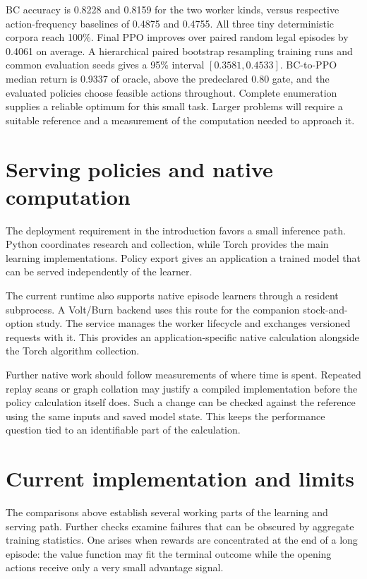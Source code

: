 \documentclass{strategynet-journal}
\begin{document}
BC accuracy is 0.8228 and 0.8159 for the two worker kinds, versus respective
action-frequency baselines of 0.4875 and 0.4755.  All three tiny deterministic
corpora reach 100\%.  Final PPO improves over paired random legal episodes by
0.4061 on average.  A hierarchical paired bootstrap resampling training runs
and common evaluation seeds gives a 95\% interval $[0.3581,0.4533]$.
BC-to-PPO median return is 0.9337 of oracle, above the predeclared 0.80 gate,
and the evaluated policies choose feasible actions throughout. Complete
enumeration supplies a reliable optimum for this small task. Larger problems
will require a suitable reference and a measurement of the computation needed
to approach it.

\begin{SNcolumns}

\section{Serving policies and native computation}

The deployment requirement in the introduction favors a small inference path.
Python coordinates research and collection, while Torch provides the main
learning implementations. Policy export gives an application a trained model
that can be served independently of the learner.

The current runtime also supports native episode learners through a resident
subprocess. A Volt/Burn backend uses this route for the companion
stock-and-option study. The service manages the worker lifecycle and exchanges
versioned requests with it. This provides an application-specific native
calculation alongside the Torch algorithm collection.

Further native work should follow measurements of where time is spent.
Repeated replay scans or graph collation may justify a compiled implementation
before the policy calculation itself does. Such a change can be checked against
the reference using the same inputs and saved model state. This keeps the
performance question tied to an identifiable part of the calculation.

\section{Current implementation and limits}

The comparisons above establish several working parts of the learning and
serving path. Further checks examine failures that can be obscured by aggregate
training statistics. One arises when rewards are concentrated at the end of a
long episode: the value function may fit the terminal outcome while the
opening actions receive only a very small advantage signal.


\end{SNcolumns}
\end{document}
